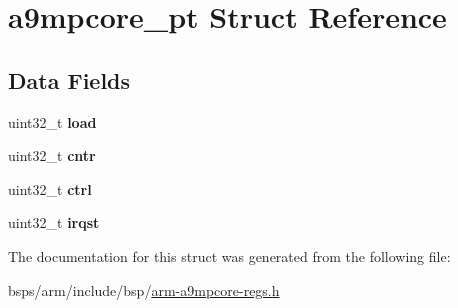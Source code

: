 \hypertarget{structa9mpcore__pt}{}\section{a9mpcore\+\_\+pt Struct Reference}
\label{structa9mpcore__pt}
\subsection*{Data Fields}
\begin{DoxyCompactItemize}
\item 
\mbox{\label{structa9mpcore__pt_a16959f3ac85322cb49dfeace121bc837}} 
uint32\+\_\+t {\bfseries load}
\item 
\mbox{\label{structa9mpcore__pt_a1c10ab8e7704bc7da36a5dab3ccd8934}} 
uint32\+\_\+t {\bfseries cntr}
\item 
\mbox{\label{structa9mpcore__pt_a4fe6d3d1369dd3fc6c04376853e0fd91}} 
uint32\+\_\+t {\bfseries ctrl}
\item 
\mbox{\label{structa9mpcore__pt_af6a10b0a3788558d9b1eadb26ca6f2dd}} 
uint32\+\_\+t {\bfseries irqst}
\end{DoxyCompactItemize}


The documentation for this struct was generated from the following file\+:\begin{DoxyCompactItemize}
\item 
bsps/arm/include/bsp/\mbox{\hyperlink{arm-a9mpcore-regs_8h}{arm-\/a9mpcore-\/regs.\+h}}\end{DoxyCompactItemize}
